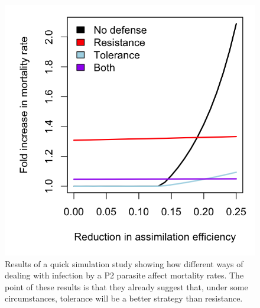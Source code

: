 \documentclass[12pt,reqno,final,pdftex]{amsart}\usepackage[]{graphicx}\usepackage[]{color}
\newenvironment{knitrout}{}{} %
\theoremstyle{plain}
\numberwithin{equation}{part}
\begin{document}
\begin{knitrout}\scriptsize
{}\color{fgcolor}\begin{figure}

\includegraphics[width=\linewidth]{figure/unnamed-chunk-4-1} \hfill{}

\caption[Results of a quick simulation study showing how different ways of dealing with infection by a P2 parasite affect mortality rates]{Results of a quick simulation study showing how different ways of dealing with infection by a P2 parasite affect mortality rates. The point of these results is that they already suggest that, under some circumstances, tolerance will be a better strategy than resistance.\label{fig:unnamed-chunk-4}}
\end{figure}


\end{knitrout}



\end{document}
